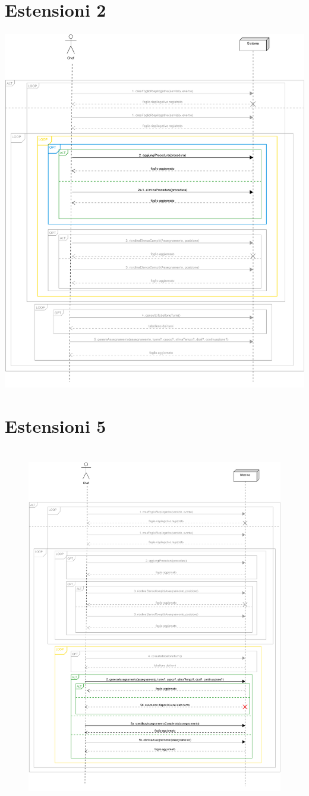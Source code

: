 \section*{Estensioni 2}
\includegraphics[max width=\textwidth, max height=158mm]{../resources/img/GCC/SSD/ext2.png}

\section*{Estensioni 5}
\begin{figure}[H]
    \centering\includegraphics[max width=\textwidth, max height=158mm]{../resources/img/GCC/SSD/ext5.png}
\end{figure}
\RaggedRight